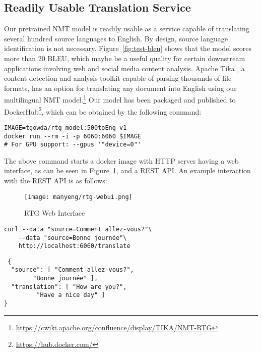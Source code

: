 \subsection{Readily Usable Translation Service}
\label{sec:value.off-shelf-mt}
Our pretrained NMT model is readily usable as a service capable of translating several hundred source languages to English.
By design, source language identification is not necessary.
Figure~\ref{fig:test-bleu} shows that the model scores more than 20 BLEU, which maybe be a useful quality for certain downstream applications involving web and social media content analysis.
Apache Tika \cite{mattmann2011tika}, a content detection and analysis toolkit capable of parsing thousands of file formats, has an option for translating any document into English using our multilingual NMT model.\footnote{\url{https://cwiki.apache.org/confluence/display/TIKA/NMT-RTG}} Our model has been packaged and published to DockerHub\footnote{\url{https://hub.docker.com/}}, which can be obtained by the following command:
\begin{verbatim}
IMAGE=tgowda/rtg-model:500toEng-v1
docker run --rm -i -p 6060:6060 $IMAGE 
# For GPU support: --gpus '"device=0"' 
\end{verbatim}

The above command starts a docker image with HTTP server having a web interface, as can be seen in Figure~\ref{fig:rtg-webui}, and a REST API.
An example interaction with the REST API is as follows: 
\begin{figure}[ht]
    \centering
    \texttt{[image: manyeng/rtg-webui.png]}
    \caption{RTG Web Interface}
    \label{fig:rtg-webui}
\end{figure}

\begin{verbatim}
curl --data "source=Comment allez-vous?"\
    --data "source=Bonne journée"\
    http://localhost:6060/translate
\end{verbatim}
\begin{verbatim}
 {
  "source": [ "Comment allez-vous?",
        "Bonne journée" ],
  "translation": [ "How are you?", 
         "Have a nice day" ]
}
\end{verbatim}


